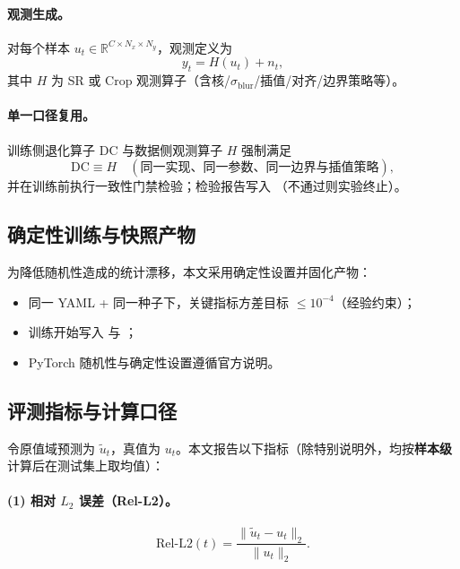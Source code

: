 \paragraph{观测生成。}
对每个样本 $u_t\in\mathbb{R}^{C\times N_x\times N_y}$，观测定义为
\begin{equation}
y_t = H(u_t) + n_t,
\label{eq:ch6_obs}
\end{equation}
其中 $H$ 为 SR 或 Crop 观测算子（含核/$\sigma_{\text{blur}}$/插值/对齐/边界策略等）。

\paragraph{单一口径复用。}
训练侧退化算子 $\mathrm{DC}$ 与数据侧观测算子 $H$ 强制满足
\begin{equation}
\mathrm{DC}\equiv H
\quad (\text{同一实现、同一参数、同一边界与插值策略}),
\label{eq:ch6_dc_equal_h}
\end{equation}
并在训练前执行一致性门禁检验；检验报告写入
（不通过则实验终止）。

\subsection{确定性训练与快照产物}\label{sec:determinism_snapshot}

为降低随机性造成的统计漂移，本文采用确定性设置并固化产物：
\begin{itemize}
  \item 同一 YAML + 同一种子下，关键指标方差目标 $\le 10^{-4}$（经验约束）；
  \item 训练开始写入  与 ；
  \item PyTorch 随机性与确定性设置遵循官方说明\cite{pytorch_randomness,pytorch_deterministic_algorithms}。
\end{itemize}

\subsection{评测指标与计算口径}\label{sec:metrics}

令原值域预测为 $\tilde u_t$，真值为 $u_t$。本文报告以下指标（除特别说明外，均按\textbf{样本级}计算后在测试集上取均值）：

\paragraph{(1) 相对 $L_2$ 误差（Rel-L2）。}
\begin{equation}
\mathrm{Rel\mbox{-}L2}(t) =
\frac{\|\tilde u_t-u_t\|_2}{\|u_t\|_2}.
\label{eq:rell2_ch6}
\end{equation}

